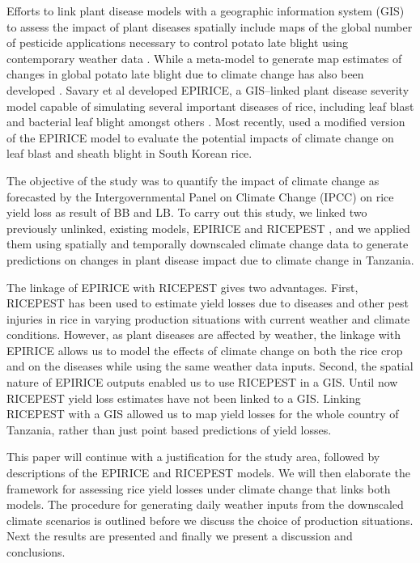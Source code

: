     Efforts to link plant disease models with a geographic information system (GIS) to assess the impact of plant diseases spatially include maps of the global number of pesticide applications necessary to control potato late blight using contemporary weather data \citep{Hijmans2000}. While a meta-model to generate map estimates of changes in global potato late blight due to climate change has also been developed \citep{Sparks2014}. Savary et al developed EPIRICE, a GIS--linked plant disease severity model capable of simulating several important diseases of rice, including leaf blast and bacterial leaf blight amongst others \citep{Savary2012}. Most recently, \citet{Kim2015} used a modified version of the EPIRICE model to evaluate the potential impacts of climate change on leaf blast and sheath blight in South Korean rice.
    
    The objective of the study was to quantify the impact of climate change as forecasted by the Intergovernmental Panel on Climate Change (IPCC) on rice yield loss as result of BB and LB. To carry out this study, we linked two previously unlinked, existing models, EPIRICE and RICEPEST \citep{Willocquet2000,Willocquet2002}, and we applied them using spatially and temporally downscaled climate change data to generate predictions on changes in plant disease impact due to climate change in Tanzania.
    
    The linkage of EPIRICE with RICEPEST gives two advantages. First, RICEPEST has been used to estimate yield losses due to diseases and other pest injuries in rice in varying production situations with current weather and climate conditions. However, as plant diseases are affected by weather, the linkage with EPIRICE allows us to model the effects of climate change on both the rice crop and on the diseases while using the same weather data inputs. Second, the spatial nature of EPIRICE outputs enabled us to use RICEPEST in a GIS. Until now RICEPEST yield loss estimates have not been linked to a GIS. Linking RICEPEST with a GIS allowed us to map yield losses for the whole country of Tanzania, rather than just point based predictions of yield losses.
    
    This paper will continue with a justification for the study area, followed by descriptions of the EPIRICE and RICEPEST models. We will then elaborate the framework for assessing rice yield losses under climate change that links both models. The procedure for generating daily weather inputs from the downscaled climate scenarios is outlined before we discuss the choice of production situations. Next the results are presented and finally we present a discussion and conclusions.
    
